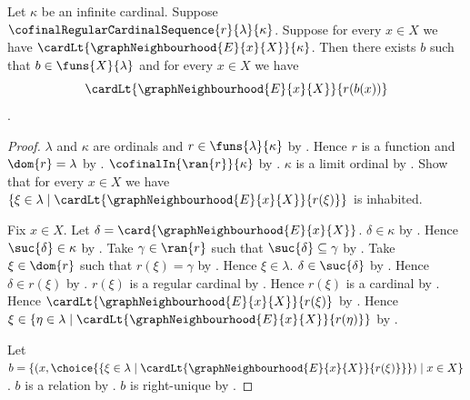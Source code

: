 \begin{theorem}\label{cofinal_sequence_degree_bound_map}
    Let $\kappa$ be an infinite cardinal.
    Suppose $\cofinalRegularCardinalSequence{r}{\lambda}{\kappa}$.
    Suppose for every $x\in X$ we have
        $\cardLt{\graphNeighbourhood{E}{x}{X}}{\kappa}$.
    Then there exists $b$ such that
        $b\in\funs{X}{\lambda}$ and for every $x\in X$ we have
        \[
            \cardLt{\graphNeighbourhood{E}{x}{X}}{r(b(x))}
        \].
\end{theorem}
\begin{proof}
    $\lambda$ and $\kappa$ are ordinals and
        $r\in\funs{\lambda}{\kappa}$ by
        .
    Hence $r$ is a function and $\dom{r}=\lambda$ by
        .
    $\cofinalIn{\ran{r}}{\kappa}$ by
        .
    $\kappa$ is a limit ordinal by
        .
    Show that for every $x\in X$ we have
        $\{\xi\in\lambda\mid
            \cardLt{\graphNeighbourhood{E}{x}{X}}{r(\xi)}\}$
        is inhabited.
    \begin{subproof}
        Fix $x\in X$.
        Let $\delta=\card{\graphNeighbourhood{E}{x}{X}}$.
        $\delta\in\kappa$ by
            .
        Hence $\suc{\delta}\in\kappa$ by .
        Take $\gamma\in\ran{r}$ such that
            $\suc{\delta}\subseteq\gamma$ by .
        Take $\xi\in\dom{r}$ such that $r(\xi)=\gamma$ by
            .
        Hence $\xi\in\lambda$.
        $\delta\in\suc{\delta}$ by .
        Hence $\delta\in r(\xi)$ by .
        $r(\xi)$ is a regular cardinal by
            .
        Hence $r(\xi)$ is a cardinal by .
        Hence $\cardLt{\graphNeighbourhood{E}{x}{X}}{r(\xi)}$ by
            .
        Hence $\xi\in
            \{\eta\in\lambda\mid
                \cardLt{\graphNeighbourhood{E}{x}{X}}{r(\eta)}\}$ by
            \auto.
    \end{subproof}
    Let $b=\{(x,\choice{\{\xi\in\lambda\mid
        \cardLt{\graphNeighbourhood{E}{x}{X}}{r(\xi)}\}})
        \mid x\in X\}$.
    $b$ is a relation by
        .
    $b$ is right-unique by
        .

\end{proof}
